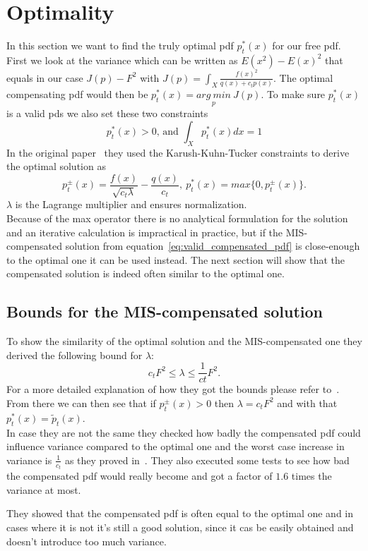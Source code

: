 \section{Optimality}
\label{sec:misc_optimality}
In this section we want to find the truly optimal pdf $ p_t^*(x) $ for our free pdf.
First we look at the variance
which can be written as $ E(x^2) - E(x)^2 $ that equals in our case $ J(p) - F^2 $ with $ J(p) = \int_X \frac{f(x)^2}{q(x) + c_t p(x)} $.
The optimal compensating pdf would then be $ p_t^*(x) = \underset{p}{arg~min}~J(p) $.
To make sure $ p_t^*(x) $ is a valid pds we also set these two constraints $$ p_t^*(x) > 0 \text{, and } \int_X p_t^*(x) dx = 1 $$
In the original paper~\cite[Appendix~A]{Karlik2019} they used the Karush-Kuhn-Tucker constraints
to derive the optimal solution as $$ p_t^{\pm}(x) = \frac{f(x)}{\sqrt{c_t \lambda}} - \frac{q(x)}{c_t},~p_t^*(x) = max\{0, p_t^{\pm}(x)\}. $$
$ \lambda $ is the Lagrange multiplier and ensures normalization.\\
Because of the max operator there is no analytical formulation for the solution and an iterative calculation is impractical in practice,
but if the MIS-compensated solution from equation~\ref{eq:valid_compensated_pdf} is close-enough to the optimal one it can be used instead.
The next section will show that the compensated solution is indeed often similar to the optimal one.


\subsection{Bounds for the MIS-compensated solution}
To show the similarity of the optimal solution and the MIS-compensated one
they derived the following bound for $ \lambda $: $$ c_t F^2 \leq \lambda \leq \frac{1}{ct} F^2. $$
For a more detailed explanation of how they got the bounds please refer to~\cite[Appendix~B]{Karlik2019}.
From there we can then see that if $ p_t^{\pm}(x) > 0 $ then $ \lambda = c_t F^2 $ and with that $ p_t^*(x) = \tilde{p}_t(x) $.\\
In case they are not the same they checked how badly the compensated pdf could influence variance compared to the optimal one
and the worst case increase in variance is $ \frac{1}{c_t} $ as they proved in~\cite[Appendix~C]{Karlik2019}.
They also executed some tests to see how bad the compensated pdf would really become
and got a factor of $ 1.6 $ times the variance at most.

They showed that the compensated pdf is often equal to the optimal one
and in cases where it is not it's still a good solution,
since it cas be easily obtained and doesn't introduce too much variance.



